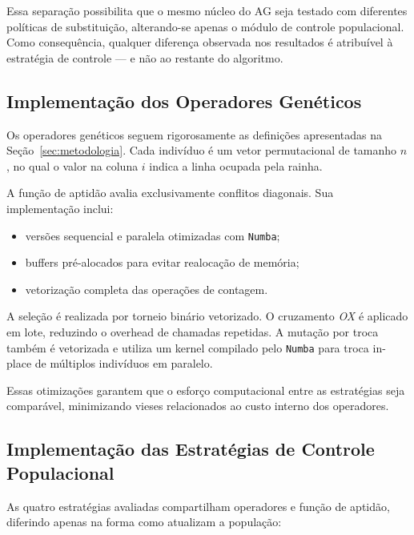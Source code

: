 Essa separação possibilita que o mesmo núcleo do AG seja testado com diferentes políticas de substituição, alterando-se apenas o módulo de controle populacional. Como consequência, qualquer diferença observada nos resultados é atribuível à estratégia de controle — e não ao restante do algoritmo.

\subsection{Implementação dos Operadores Genéticos}

Os operadores genéticos seguem rigorosamente as definições apresentadas na Seção~\ref{sec:metodologia}. Cada indivíduo é um vetor permutacional de tamanho $n$, no qual o valor na coluna $i$ indica a linha ocupada pela rainha.

A função de aptidão avalia exclusivamente conflitos diagonais. Sua implementação inclui:
\begin{itemize}
    \item versões sequencial e paralela otimizadas com \texttt{Numba};
    \item buffers pré-alocados para evitar realocação de memória;
    \item vetorização completa das operações de contagem.
\end{itemize}

A seleção é realizada por torneio binário vetorizado. O cruzamento \textit{OX} é aplicado em lote, reduzindo o overhead de chamadas repetidas. A mutação por troca também é vetorizada e utiliza um kernel compilado pelo \texttt{Numba} para troca in-place de múltiplos indivíduos em paralelo.

Essas otimizações garantem que o esforço computacional entre as estratégias seja comparável, minimizando vieses relacionados ao custo interno dos operadores.

\subsection{Implementação das Estratégias de Controle Populacional}

As quatro estratégias avaliadas compartilham operadores e função de aptidão, diferindo apenas na forma como atualizam a população:

